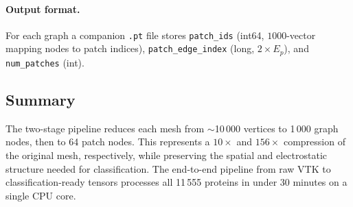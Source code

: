 \paragraph{Output format.}
For each graph a companion \texttt{.pt} file stores
\texttt{patch\_ids} (int64, $1000$-vector mapping nodes to patch indices),
\texttt{patch\_edge\_index} (long, $2 \times E_p$), and
\texttt{num\_patches} (int).

\subsection{Summary}

The two-stage pipeline reduces each mesh from $\sim$10\,000 vertices to 1\,000
graph nodes, then to 64 patch nodes.
This represents a $10\times$ and $156\times$ compression of the original mesh,
respectively, while preserving the spatial and electrostatic structure needed
for classification.
The end-to-end pipeline from raw VTK to classification-ready tensors processes
all 11\,555 proteins in under 30 minutes on a single CPU core.
